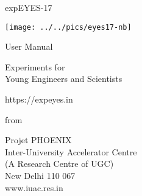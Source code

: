 \documentclass[12pt,a4paper]{report}
\begin{document}
\begin{titlepage}
\thispagestyle{empty}

\vspace{0.2in}

\begin{center}
{\Huge{}expEYES-17}
\par\end{center}{\Huge \par}

\begin{center}
\texttt{[image: ../../pics/eyes17-nb]}
\par\end{center}

\begin{center}
{\large{}User Manual }
\par\end{center}{\large \par}

\begin{center}
{\LARGE{} Experiments for}\\
{\LARGE{} Young Engineers and Scientists}
\par\end{center}{\LARGE \par}

\begin{center}
https://expeyes.in
\par\end{center}

\begin{center}
from
\par\end{center}

\begin{center}
Projet PHOENIX\\
Inter-University Accelerator Centre \\
(A Research Centre of UGC)\\
New Delhi 110 067\\
www.iuac.res.in
\par\end{center}

\end{titlepage}
\end{document}
